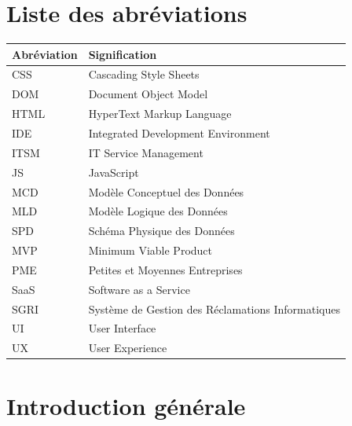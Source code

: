 \documentclass[12pt,a4paper,oneside]{report}
\begin{document}
\newpage
\chapter*{Liste des abréviations}

\begin{longtable}{p{4cm} p{10cm}}
    \toprule
    \textbf{Abréviation} & \textbf{Signification} \\
    \midrule
    \endhead
    \bottomrule
    \endfoot
    
    CSS  & Cascading Style Sheets \\
    DOM  & Document Object Model \\
    HTML & HyperText Markup Language \\
    IDE  & Integrated Development Environment \\
    ITSM & IT Service Management \\
    JS   & JavaScript \\
    MCD  & Modèle Conceptuel des Données \\
    MLD  & Modèle Logique des Données \\
    SPD  & Schéma Physique des Données \\
    MVP  & Minimum Viable Product \\
    PME  & Petites et Moyennes Entreprises \\
    SaaS & Software as a Service \\
    SGRI & Système de Gestion des Réclamations Informatiques \\
    UI   & User Interface \\
    UX   & User Experience \\
\end{longtable}

\newpage
\tableofcontents

\chapter{Introduction générale}
\end{document}
